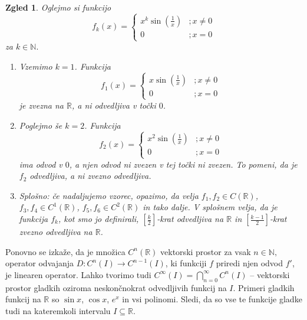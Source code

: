 \documentclass[10pt, a4paper]{article}
\newtheorem{zgled}{Zgled}[section]
\newcommand{\N}{\mathbb {N}}
\newcommand{\R}{\mathbb {R}}
\begin{document}
\begin{zgled}
    Oglejmo si funkcijo
    $$f_k(x) = \begin{cases}
        x^k \sin \left(\frac{1}{x}\right) &; x \neq 0\\
        0 &; x = 0
    \end{cases}$$ za $k \in \N.$
    \begin{enumerate}
        \item Vzemimo $k = 1$. Funkcija 
        $$f_1(x) = \begin{cases}
            x \sin \left(\frac{1}{x}\right) &; x \neq 0\\
            0 &; x = 0
        \end{cases}$$
        je zvezna na $\R$, a ni odvedljiva v točki $0$.
        \item Poglejmo še $k = 2$. Funkcija 
        $$f_2(x) = \begin{cases}
            x^2 \sin \left(\frac{1}{x}\right) &; x \neq 0\\
            0 &; x = 0
        \end{cases}$$
        ima odvod v $0$, a njen odvod ni zvezen v tej točki ni zvezen.
        To pomeni, da je $f_2$ odvedljiva, a ni zvezno odvedljiva.
        \item Splošno: če nadaljujemo vzorec, opazimo, da velja $f_1, f_2 \in C(\R)$, $f_3, f_4 \in C^1 (\R)$, $f_5, f_6 \in C^2 (\R)$ in tako dalje.
        V splošnem velja, da je funkcija $f_k$, kot smo jo definirali, $\left[\frac{k}{2}\right]$-krat odvedljiva na $\R$ in $\left[\frac{k - 1}{2}\right]$-krat zvezno odvedljiva na $\R$.
    \end{enumerate}
\end{zgled}

Ponovno se izkaže, da je množica $C^n (\R)$ vektorski prostor za vsak $n \in \N,$
operator odvajanja $D: C^n (I) \rightarrow C^{n-1} (I)$, ki funkciji $f$ priredi njen odvod $f'$, je linearen operator.
Lahko tvorimo tudi $C^{\infty} (I) = \bigcap_{n = 0} ^{\infty} C^n (I)$ -- vektorski prostor gladkih oziroma neskončnokrat odvedljivih funkcij na $I$.
Primeri gladkih funkcij na $\R$ so $\sin x$, $\cos x$, $e^x$ in vsi polinomi.
Sledi, da so vse te funkcije gladke tudi na kateremkoli intervalu $I \subseteq \R$.
\end{document}
